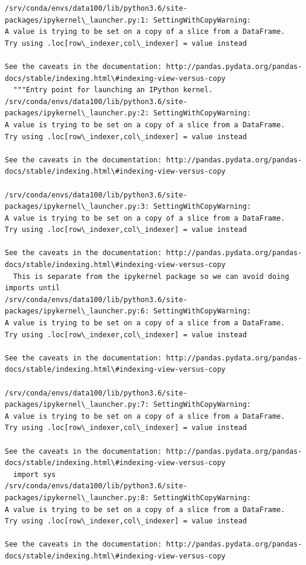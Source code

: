 \documentclass[11pt]{article}
\begin{document}
    \begin{Verbatim}[commandchars=\\\{\}]
/srv/conda/envs/data100/lib/python3.6/site-packages/ipykernel\_launcher.py:1: SettingWithCopyWarning: 
A value is trying to be set on a copy of a slice from a DataFrame.
Try using .loc[row\_indexer,col\_indexer] = value instead

See the caveats in the documentation: http://pandas.pydata.org/pandas-docs/stable/indexing.html\#indexing-view-versus-copy
  """Entry point for launching an IPython kernel.
/srv/conda/envs/data100/lib/python3.6/site-packages/ipykernel\_launcher.py:2: SettingWithCopyWarning: 
A value is trying to be set on a copy of a slice from a DataFrame.
Try using .loc[row\_indexer,col\_indexer] = value instead

See the caveats in the documentation: http://pandas.pydata.org/pandas-docs/stable/indexing.html\#indexing-view-versus-copy
  
/srv/conda/envs/data100/lib/python3.6/site-packages/ipykernel\_launcher.py:3: SettingWithCopyWarning: 
A value is trying to be set on a copy of a slice from a DataFrame.
Try using .loc[row\_indexer,col\_indexer] = value instead

See the caveats in the documentation: http://pandas.pydata.org/pandas-docs/stable/indexing.html\#indexing-view-versus-copy
  This is separate from the ipykernel package so we can avoid doing imports until
/srv/conda/envs/data100/lib/python3.6/site-packages/ipykernel\_launcher.py:6: SettingWithCopyWarning: 
A value is trying to be set on a copy of a slice from a DataFrame.
Try using .loc[row\_indexer,col\_indexer] = value instead

See the caveats in the documentation: http://pandas.pydata.org/pandas-docs/stable/indexing.html\#indexing-view-versus-copy
  
/srv/conda/envs/data100/lib/python3.6/site-packages/ipykernel\_launcher.py:7: SettingWithCopyWarning: 
A value is trying to be set on a copy of a slice from a DataFrame.
Try using .loc[row\_indexer,col\_indexer] = value instead

See the caveats in the documentation: http://pandas.pydata.org/pandas-docs/stable/indexing.html\#indexing-view-versus-copy
  import sys
/srv/conda/envs/data100/lib/python3.6/site-packages/ipykernel\_launcher.py:8: SettingWithCopyWarning: 
A value is trying to be set on a copy of a slice from a DataFrame.
Try using .loc[row\_indexer,col\_indexer] = value instead

See the caveats in the documentation: http://pandas.pydata.org/pandas-docs/stable/indexing.html\#indexing-view-versus-copy
  

    \end{Verbatim}
\end{document}
